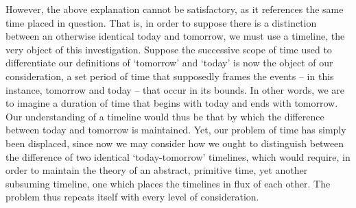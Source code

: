 \documentclass{article}
\begin{document}
However, the above explanation cannot be satisfactory, as it references the same time placed in question. That is, in order to suppose there is a distinction between an otherwise identical today and tomorrow, we must use a timeline, the very object of this investigation. Suppose the successive scope of time used to differentiate our definitions of ‘tomorrow’ and ‘today’ is now the object of our consideration, a set period of time that supposedly frames the events – in this instance, tomorrow and today – that occur in its bounds. In other words, we are to imagine a duration of time that begins with today and ends with tomorrow. Our understanding of a timeline would thus be that by which the difference between today and tomorrow is maintained. Yet, our problem of time has simply been displaced, since now we may consider how we ought to distinguish between the difference of two identical ‘today-tomorrow’ timelines, which would require, in order to maintain the theory of an abstract, primitive time, yet another subsuming timeline, one which places the timelines in flux of each other. The problem thus repeats itself with every level of consideration.
\end{document}
